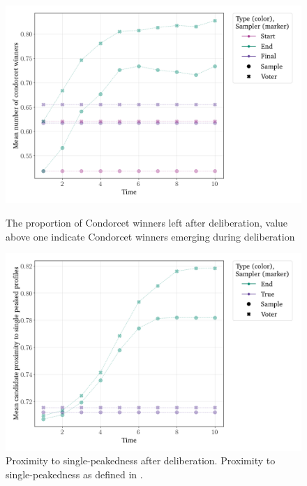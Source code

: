 \documentclass[11pt, oneside, dvipsnames]{Thesis} %
\begin{document}
\begin{figure}[htbp]
	\vspace{1em}

	\begin{minipage}{0.45\textwidth}
		\centering
		\includegraphics[width=\textwidth]{Figures/delib_Mean number of Condorcet winners.png}
		\caption{The proportion of Condorcet winners left after deliberation, value above one indicate Condorcet winners emerging during deliberation}
		\label{fig:degroot_condorcet}
	\end{minipage}\hfill
	\begin{minipage}{0.45\textwidth}
		\centering
		\vspace{-9pt}
		\includegraphics[width=\textwidth]{Figures/delib_Mean candidate proximity to single peaked Profiles.png}
		\caption{Proximity to single-peakedness after deliberation. Proximity to single-peakedness as defined in .}
		\label{fig:degroot_single_peaked}
	\end{minipage}
\end{figure}
\end{document}
